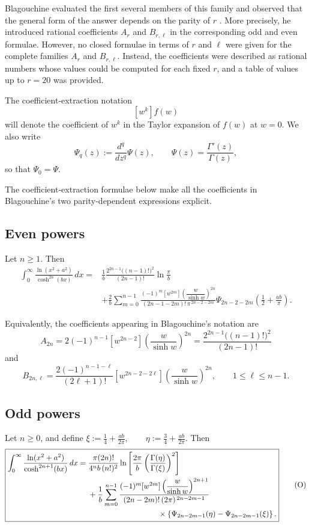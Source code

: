 \documentclass[11pt,twoside]{article}
\numberwithin{equation}{section}
\begin{document}
Blagouchine evaluated the first several members of this family and
observed that the general form of the answer depends on the parity of
\(r\) \cite{Blagouchine2014}. More precisely, he introduced rational
coefficients \(A_r\) and \(B_{r,\ell}\) in the corresponding odd and
even formulae. However, no closed formulae in terms of \(r\) and
\(\ell\) were given for the complete families \(A_r\) and
\(B_{r,\ell}\). Instead, the coefficients were described as rational
numbers whose values could be computed for each fixed \(r\), and a
table of values up to \(r=20\) was provided.

The coefficient-extraction notation
\[
[w^k]f(w)
\]
will denote the coefficient of \(w^k\) in the Taylor expansion of
\(f(w)\) at \(w=0\). We also write
\[
\Psi_q(z)
:=
\frac{d^q}{dz^q}\Psi(z),
\qquad
\Psi(z)=\frac{\Gamma'(z)}{\Gamma(z)},
\]
so that \(\Psi_0=\Psi\).

The coefficient-extraction formulae below make all the coefficients
in Blagouchine's two parity-dependent expressions explicit.

\subsection{Even powers}

Let \(n\geq 1\). Then
\[
\boxed{
\begin{aligned}
\int_{0}^{\infty}
\frac{\ln(x^{2}+a^{2})}{\cosh^{2n}(bx)}\,dx
={}&
\frac{1}{b}
\frac{
2^{2n-1}\bigl((n-1)!\bigr)^2
}{
(2n-1)!
}
\ln\frac{\pi}{b}
\\
&+
\frac{2}{b}
\sum_{m=0}^{n-1}
\frac{
(-1)^m
[w^{2m}]
\left(\dfrac{w}{\sinh w}\right)^{2n}
}{
(2n-1-2m)!\,
\pi^{\,2n-2-2m}
}
\Psi_{2n-2-2m}\left(\frac12+\frac{ab}{\pi}\right).
\end{aligned}
}
\tag{E}
\]

Equivalently, the coefficients appearing in Blagouchine's notation
are
\[
\boxed{
A_{2n}
=
2(-1)^{n-1}
[w^{2n-2}]
\left(\frac{w}{\sinh w}\right)^{2n}=
\frac{
2^{2n-1}\bigl((n-1)!\bigr)^2
}{
(2n-1)!
}}
\]
and
\[
\boxed{
B_{2n,\ell}
=
\frac{
2(-1)^{n-1-\ell}
}{
(2\ell+1)!
}
[w^{2n-2-2\ell}]
\left(\frac{w}{\sinh w}\right)^{2n},
\qquad
1\leq \ell\leq n-1.
}
\]

\subsection{Odd powers}

Let \(n\geq 0\), and define \(\displaystyle
\xi:=\frac14+\frac{ab}{2\pi},
\qquad
\eta:=\frac34+\frac{ab}{2\pi}.
\)
Then
\[
\boxed{
\begin{aligned}
\int_{0}^{\infty}
\frac{\ln(x^{2}+a^{2})}{\cosh^{2n+1}(bx)}\,dx
={}&
\frac{\pi(2n)!}{4^n b\,(n!)^2}
\ln\left[
\frac{2\pi}{b}
\left(
\frac{\Gamma(\eta)}{\Gamma(\xi)}
\right)^2
\right]
\\
&+
\frac{1}{b}
\sum_{m=0}^{n-1}
\frac{
(-1)^m
[w^{2m}]
\left(\dfrac{w}{\sinh w}\right)^{2n+1}
}{
(2n-2m)!\,
(2\pi)^{\,2n-2m-1}
}
\\
&\hspace{32mm}\times
\left\{
\Psi_{2n-2m-1}(\eta)
-
\Psi_{2n-2m-1}(\xi)
\right\}.
\end{aligned}
}
\tag{O}
\]
\end{document}
